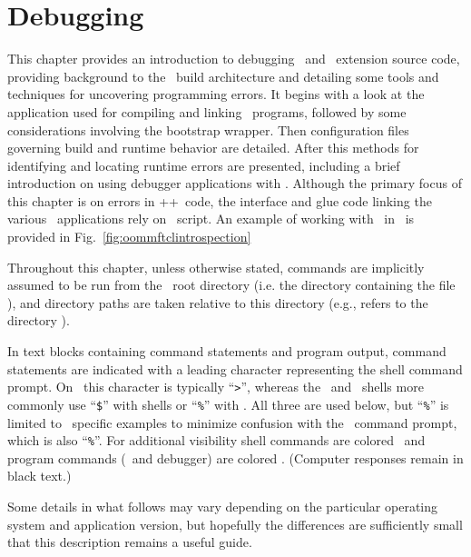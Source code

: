 \chapter{Debugging \OOMMF}\label{sec:debug}
\newlength{\sswidth} %
\setlength{\sswidth}{\textwidth}
\addtolength{\sswidth}{-1em}
This chapter provides an introduction to debugging \OOMMF\ and
\OOMMF\ extension source code, providing background to the \OOMMF\ build
architecture and detailing some tools and techniques for uncovering
programming errors. It begins with a look at the \OOMMF\ 
application used for compiling and linking \OOMMF\ programs, followed by
some considerations involving the  bootstrap
wrapper. Then configuration files governing build and runtime behavior
are detailed.  After this methods for identifying and locating runtime
errors are presented, including a brief introduction on using debugger
applications with \OOMMF. Although the primary focus of this chapter is
on errors in \C++\ code, the interface and glue code linking the various
\OOMMF\ applications rely on \Tcl\ script.  An example of working with
\Tcl\ in \OOMMF\ is provided in Fig.~\ref{fig:oommftclintrospection}

Throughout this chapter, unless otherwise stated, commands are
implicitly assumed to be run from the \OOMMF\ root directory (i.e. the
directory containing the file ), and directory paths are
taken relative to this directory (e.g.,  refers
to the directory ).

In text blocks containing command statements and program output,
command statements are indicated with a leading character
representing the shell command prompt. On \Windows\ this character is
typically ``\verb+>+'', whereas the \Unix\ and \MacOSX\ shells more commonly
use ``\verb+$+'' with  shells or ``\verb+%+'' with
. All three are used below, but ``\verb+%+'' is limited to
\MacOSX\ specific examples to minimize confusion with the \Tcl\ command
prompt, which is also ``\verb+%+''. For additional visibility shell
commands are colored \shellcmd{\shellcmdcolorname}\ and program commands
(\Tcl\ and debugger) are colored \pgmcmd{\pgmcmdcolorname}. (Computer
responses remain in black text.)

Some details in what follows may vary depending on the particular
operating system and application version, but hopefully the differences
are sufficiently small that this description remains a useful guide.

